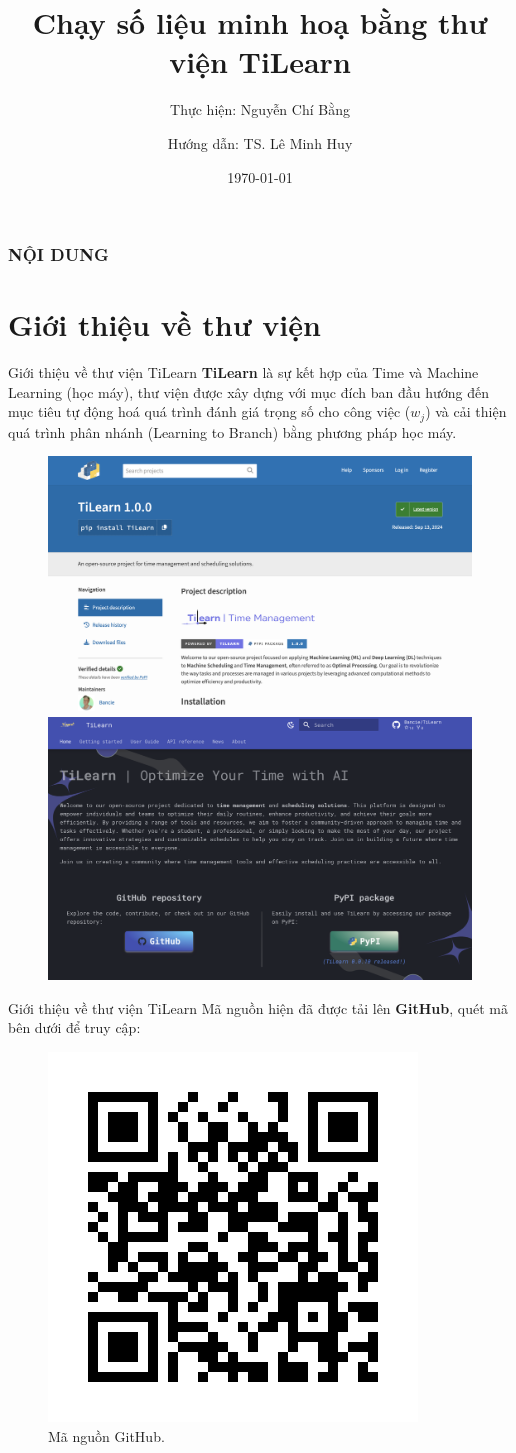 \documentclass[10pt]{beamer}
\title{Chạy số liệu minh hoạ bằng thư viện TiLearn}
\date{\today}
\author{Hướng dẫn: TS. Lê Minh Huy}
\subtitle{Thực hiện: Nguyễn Chí Bằng}
\begin{document}
\begin{frame}
  \titlepage
\end{frame}

\begin{frame}
    \frametitle{NỘI DUNG}
    \tableofcontents
\end{frame}

\section{Giới thiệu về thư viện}

\begin{frame}{Giới thiệu về thư viện TiLearn}
\textbf{TiLearn} là sự kết hợp của Time và Machine Learning (học máy), thư viện được xây dựng với mục đích ban đầu hướng đến mục tiêu tự động hoá quá trình đánh giá trọng số cho công việc ($w_j$) và cải thiện quá trình phân nhánh (Learning to Branch) bằng phương pháp học máy.

\begin{figure}[h]
\centering
\includegraphics[width=0.5\linewidth]{pypi_capture.png}
\includegraphics[width=0.489\linewidth]{web_capture.png}
\end{figure}
\end{frame}

\begin{frame}{Giới thiệu về thư viện TiLearn}
Mã nguồn hiện đã được tải lên \textbf{GitHub}, quét mã bên dưới để truy cập:

\begin{figure}[h]
\centering
\includegraphics[width=0.4\linewidth]{tilearn_github.png}
\caption{Mã nguồn GitHub.}
\end{figure}
\end{frame}
\end{document}
